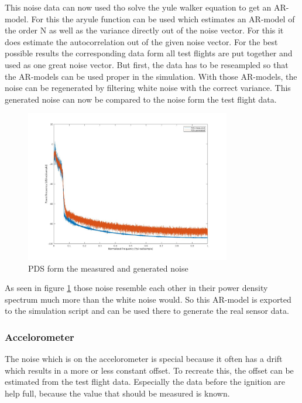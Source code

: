 This noise data can now used tho solve the yule walker equation to get an AR-model.
For this the aryule function can be used which estimates an AR-model of the order N as well as the variance directly out of the noise vector.
For this it does estimate the autocorrelation out of the given noise vector.
For the best possible results the corresponding data form all test flights are put together and used as one great noise vector.
But first, the data has to be reseampled so that the AR-models can be used proper in the simulation.
With those AR-models, the noise can be regenerated by filtering white noise with the correct variance.
This generated noise can now be compared to the noise form the test flight data.

\begin{figure}[h!]
 \centering
 \includegraphics[width=0.8\textwidth]{./Pictures/PDSnoise.jpg}
 \caption{PDS form the measured and generated noise}
 \label{fig:PDSNoise}
\end{figure}


As seen in figure \ref{fig:PDSNoise} those noise resemble each other in their power density spectrum much more than the white noise would.
So this AR-model is exported to the simulation script and can be used there to generate the real sensor data.

\subsubsection{Accelorometer}
The noise which is on the accelorometer is special because it often has a drift which results in a more or less constant offset.
To recreate this, the offset can be estimated from the test flight data.
Especially the data before the ignition are help full, because the value that should be measured is known.

